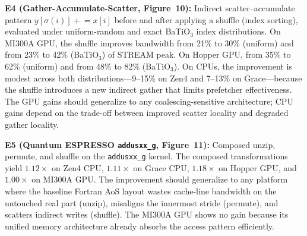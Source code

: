 \documentclass[conference]{IEEEtran}
\begin{document}
\textbf{E4 (Gather-Accumulate-Scatter, Figure~10):}
Indirect scatter--accumulate pattern $y[\sigma(i)] \mathrel{+}= x[i]$ before and after applying a shuffle (index sorting), evaluated under uniform-random and exact BaTiO$_3$ index distributions.
On MI300A GPU, the shuffle improves bandwidth from 21\% to 30\% (uniform) and from 23\% to 42\% (BaTiO$_3$) of STREAM peak.
On Hopper GPU, from 35\% to 62\% (uniform) and from 48\% to 82\% (BaTiO$_3$).
On CPUs, the improvement is modest across both distributions---9--15\% on Zen4 and 7--13\% on Grace---because the shuffle introduces a new indirect gather that limits prefetcher effectiveness.
The GPU gains should generalize to any coalescing-sensitive architecture; CPU gains depend on the trade-off between improved scatter locality and degraded gather locality.

\textbf{E5 (Quantum ESPRESSO \texttt{addusxx\_g}, Figure~11):}
Composed unzip, permute, and shuffle on the \texttt{addusxx\_g} kernel.
The composed transformations yield $1.12\times$ on Zen4 CPU, $1.11\times$ on Grace CPU, $1.18\times$ on Hopper GPU, and $1.00\times$ on MI300A GPU.
The improvement should generalize to any platform where the baseline Fortran AoS layout wastes cache-line bandwidth on the untouched real part (unzip), misaligns the innermost stride (permute), and scatters indirect writes (shuffle).
The MI300A GPU shows no gain because its unified memory architecture already absorbs the access pattern efficiently.
\end{document}
